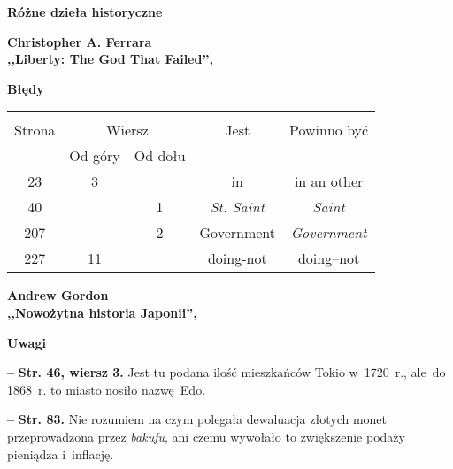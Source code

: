 \documentclass[a4paper,11pt]{article}
\newcommand{\spaceTwo}{2em}
\newcommand{\spaceThree}{1em}
\newcommand{\spaceFour}{0.5em}
\newcommand{\tb}{\textbf}
\newcommand{\noi}{\noindent}
\newcommand{\start}{\noi \tb{--} {}}
\newcommand{\Center}[1]{\begin{center} #1 \end{center}}
\newcommand{\CenterTB}[1]{\Center{\tb{#1}}}
\newcommand{\Str}[1]{\tb{Str. #1.}}
\newcommand{\StrWg}[2]{\tb{Str. #1, wiersz #2.}}
\newcommand{\Field}[1]{ \begin{center} {\LARGE \tb{#1} } \end{center} }
\newcommand{\Work}[1]{ \begin{center} {\large \tb{#1}} \end{center} }
\begin{document}
\vspace{\spaceTwo}





\newpage
\Field{Różne dzieła historyczne}

\vspace{\spaceTwo} \vspace{\spaceThree}



\Work{
  Christopher A. Ferrara \\
  ,,Liberty: The God That Failed'', \cite{Ferrara12} }


\CenterTB{Błędy}

\begin{center}
  \begin{tabular}{|c|c|c|c|c|}
    \hline
    & \multicolumn{2}{c|}{} & & \\
    Strona & \multicolumn{2}{c|}{Wiersz}& Jest & Powinno być \\ \cline{2-3}
    & Od góry & Od dołu &  &  \\ \hline
    23 & 3 & & in & in an other \\
    40 & & 1 & \emph{St. Saint} & \emph{Saint} \\
    207 & & 2 & Government & \emph{Government} \\
    227 & 11 & & doing-not & doing--not \\
    \hline
  \end{tabular}
\end{center}

\vspace{\spaceTwo}





\Work{
  Andrew Gordon \\
  ,,Nowożytna historia Japonii'',
  \cite{GordonNowozytnaHistoriaJaponii10} }


\CenterTB{Uwagi}

\start \StrWg{46}{3} Jest tu podana ilość mieszkańców Tokio w~1720~r.,
ale~do 1868~r. to miasto nosiło nazwę~Edo.

\vspace{\spaceFour}


\start \Str{83} Nie rozumiem na czym polegała dewaluacja złotych monet
przeprowadzona przez \emph{bakufu}, ani czemu wywołało to zwiększenie
podaży pieniądza i~inflację.
\end{document}
